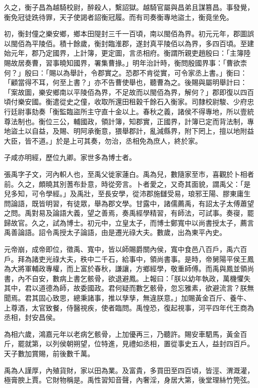 \begin{pinyinscope}
久之，衡子昌為越騎校尉，醉殺人，繫詔獄。越騎官屬與昌弟且謀篡昌。事發覺，衡免冠徒跣待罪，天子使謁者詔衡冠履。而有司奏衡專地盜土，衡竟坐免。

初，衡封僮之樂安鄉，鄉本田隄封三千一百頃，南以閩佰為界。初元元年，郡圖誤以閩佰為平陵佰。積十餘歲，衡封臨淮郡，遂封真平陵佰以為界，多四百頃。至建始元年，郡乃定國界，上計簿，更定圖，言丞相府。衡謂所親吏趙殷曰：「主簿陸賜故居奏曹，習事曉知國界，署集曹掾。」明年治計時，衡問殷國界事：「曹欲柰何？」殷曰：「賜以為舉計，令郡實之。恐郡不肯從實，可令家丞上書。」衡曰：「顧當得不耳，何至上書？」亦不告曹使舉也，聽曹為之。後賜與屬明舉計曰：「案故圖，樂安鄉南以平陵佰為界，不足故而以閩佰為界，解何？」郡即復以四百頃付樂安國。衡遣從史之僮，收取所還田租穀千餘石入衡家。司隸校尉駿、少府忠行廷尉事劾奏「衡監臨盜所主守直十金以上。春秋之義，諸侯不得專地，所以壹統尊法制也。衡位三公，輔國政，領計簿，知郡實，正國界，計簿已定而背法制，專地盜土以自益，及賜、明阿承衡意，猥舉郡計，亂減縣界，附下罔上，擅以地附益大臣，皆不道。」於是上可其奏，勿治，丞相免為庶人，終於家。

子咸亦明經，歷位九卿。家世多為博士者。

張禹字子文，河內軹人也，至禹父徙家蓮白。禹為兒，數隨家至市，喜觀於卜相者前。久之，頗曉其別蓍布卦意，時從旁言。卜者愛之，又奇其面貌，謂禹父：「是兒多知，可令學經。」及禹壯，至長安學，從沛郡施讎受易，琅邪王陽、膠東庸生問論語，既皆明習，有徒眾，舉為郡文學。甘露中，諸儒薦禹，有詔太子太傅蕭望之問。禹對易及論語大義，望之善焉，奏禹經學精習，有師法，可試事。奏寑，罷歸故官。久之，試為博士。初元中，立皇太子，而博士鄭寬中以尚書授太子，薦言禹善論語。詔令禹授太子論語，由是遷光祿大夫。數歲，出為東平內史。

元帝崩，成帝即位，徵禹、寬中，皆以師賜爵關內侯，寬中食邑八百戶，禹六百戶。拜為諸吏光祿大夫，秩中二千石，給事中，領尚書事。是時，帝舅陽平侯王鳳為大將軍輔政專權，而上富於春秋，謙讓，方鄉經學，敬重師傅。而禹與鳳並領尚書，內不自安，數病上書乞骸骨，欲退避鳳。上報曰：「朕以幼年執政，萬機懼失其中，君以道德為師，故委國政。君何疑而數乞骸骨，忽忘雅素，欲避流言？朕無聞焉。君其固心致思，總秉諸事，推以孳孳，無違朕意。」加賜黃金百斤、養牛、上尊酒，太官致餐，侍醫視疾，使者臨問。禹惶恐，復起視事，河平四年代王商為丞相，封安昌侯。

為相六歲，鴻嘉元年以老病乞骸骨，上加優再三，乃聽許。賜安車駟馬，黃金百斤，罷就第，以列侯朝朔望，位特進，見禮如丞相，置從事史五人，益封四百戶。天子數加賞賜，前後數千萬。

禹為人謹厚，內殖貨財，家以田為業。及富貴，多買田至四百頃，皆涇、渭溉灌，極膏腴上賈。它財物稱是。禹性習知音聲，內奢淫，身居大第，後堂理絲竹筦弦。


\end{pinyinscope}
